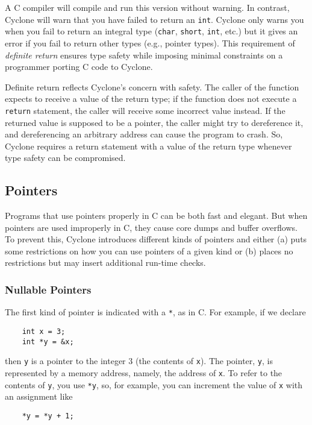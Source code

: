 A C compiler will compile and run this version without warning.  
In contrast, Cyclone will warn that you have failed to return
an \texttt{int}.  Cyclone only warns you when you fail to return
an integral type (\texttt{char}, \texttt{short}, \texttt{int}, etc.) 
but it gives an error if you fail to return
other types (e.g., pointer types).  This requirement of
\emph{definite return} ensures type safety while imposing
minimal constraints on a programmer porting C code to Cyclone.

Definite return reflects Cyclone's concern with safety.  The caller of
the function expects to receive a value of the return type; if the
function does not execute a \texttt{return} statement, the caller will
receive some incorrect value instead.  If the returned value is supposed
to be a pointer, the caller might try to dereference it, and
dereferencing an arbitrary address can cause the program to crash.  So,
Cyclone requires a return statement with a value of the return
type whenever type safety can be compromised.  

\subsection{Pointers}

Programs that use pointers properly in C can be both fast and elegant.
But when pointers are used improperly in C, they cause core dumps and
buffer overflows.  To prevent this, Cyclone introduces different kinds
of pointers and either (a) puts some restrictions on how you can use pointers
of a given kind or (b) places no restrictions but may insert additional
run-time checks.

\subsubsection*{Nullable Pointers}

The first kind of pointer is indicated with a \texttt{*}, as in C\@.  For
example, if we declare
\begin{verbatim}
    int x = 3;
    int *y = &x;
\end{verbatim}
then \texttt{y} is a pointer to the integer 3 (the contents of
\texttt{x}).  The pointer, \texttt{y}, is represented by a memory
address, namely, the address of \texttt{x}.  To refer to the contents
of \texttt{y}, you use \texttt{*y}, so, for example, you can increment
the value of \texttt{x} with an assignment like
\begin{verbatim}
    *y = *y + 1;
\end{verbatim}

